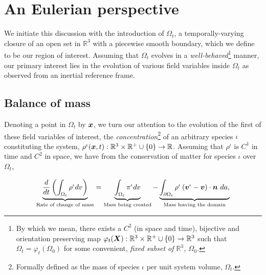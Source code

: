 \chapter{An Eulerian perspective}
\label{eulerian-perspective}

 We initiate this discussion with the introduction of $\Omega_{t}$, a
 temporally-varying closure of an open set in $\mathbb{R}^{3}$ with a
 piecewise smooth boundary, which we define to be our region of
 interest. Assuming that $\Omega_{t}$ evolves in a {\em
   well-behaved}\footnote{By which we mean, there exists a
   {\color{Blue} $\mathit{C}^{2}$} (in space and time), bijective
   and orientation preserving map $\varphi_{t}(\mbox{\boldmath$ X$}):
   \mathbb{R}^3\times\mathbb{R}^{+}\cup\{0\}
   \rightarrow\mathbb{R}^{3}$ such that $\Omega_{t} = \varphi_{t}
   (\Omega_{0})$ for some {\color{Sepia} convenient}, \em{fixed}
   subset of $\mathbb{R}^{3}$, $\Omega_{0}$.} manner, our primary
 interest lies in the evolution of various field variables inside
 $\Omega_{t}$ as observed from an inertial reference frame.
                                   
\section{Balance of mass}
\label{balance-of-mass}

Denoting a point in $\Omega_{t}$ by $\mbox{\boldmath$ x$}$, we turn our attention to
the evolution of the first of these field variables of interest, the
{\em concentration}\footnote{Formally defined as the mass of species
  $\iota$ per unit system volume, $\Omega_{t}$.} of an arbitrary
species $\iota$ constituting the system, $\rho^{\iota}(\mbox{\boldmath$ x$},t):
\mathbb{R}^3\times\mathbb{R}^{+}\cup\{0\} \rightarrow
\mathbb{R}$. Assuming that $\rho^{\iota}$ is {\color{Blue}
  $\mathit{C}^{1}$} in time and {\color{Blue} $\mathit{C}^{2}$} in
space, we have from the conservation of matter for species $\iota$
over $\Omega_{t}$,


\begin{equation}
\underbrace{\frac{d}{dt}\left(\int_{\Omega_{t}} \rho^{\iota} dv
  \right)}_{\text{Rate of change of mass}} = 
 \underbrace{\int_{\Omega_{t}}
  \pi^{\iota} dv}_{\text{Mass being created}}
- \underbrace{\int_{\partial \Omega_{t}} \rho^{\iota}
  \left(\bv^{\iota} - \bv\right) \cdot \bn\ 
da,}_{\text{Mass leaving the domain}}
\label{globalbalanceofmass}
\end{equation}

